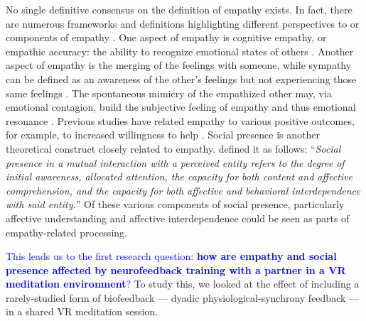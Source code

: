\documentclass[manuscript, review = false, screen]{acmart}
\begin{document}
No single definitive consensus on the definition of empathy exists. In fact, there are numerous frameworks and definitions highlighting different perspectives to or components of empathy \cite{Cuff_Brown_Taylor_Howat_2016}. One aspect of empathy is cognitive empathy, or empathic accuracy: the ability to recognize emotional states of others \cite{Janssen_2012}. Another aspect of empathy is the merging of the feelings with someone, while sympathy can be defined as an awareness of the other's feelings but not experiencing those same feelings \cite{Escalas2003}. The spontaneous mimicry of the empathized other may, via emotional contagion, build the subjective feeling of empathy and thus emotional resonance \cite{Hofelich2011, Oberman2007}. Previous studies have related empathy to various positive outcomes, for example, to increased willingness to help \cite{Coke1978}. Social presence \cite{Biocca_Harms_2002, Biocca_Harms_Burgoon_2003, Harms_Biocca_2004} is another theoretical construct closely related to empathy. \citet{Harms_Biocca_2004} defined it as follows: ``\textit{Social presence  in  a  mutual  interaction  with  a  perceived  entity  refers  to  the  degree  of  initial  awareness,  allocated  attention,  the  capacity  for  both  content  and  affective  comprehension,  and  the  capacity  for  both affective and behavioral interdependence with said entity.}'' Of these various components of social presence, particularly affective understanding and affective interdependence could be seen as parts of empathy-related processing.

\textcolor{blue}{This leads us to the first research question: {\bf how are empathy and social presence affected by neurofeedback training with a partner in a VR meditation environment}?} To study this, we looked at the effect of including a rarely-studied form of biofeedback --- dyadic physiological-synchrony feedback --- in a shared VR meditation session. 
\end{document}
